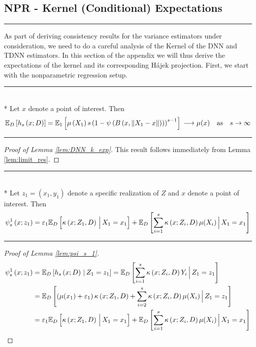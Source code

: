 \newpage
\subsection{NPR - Kernel (Conditional) Expectations}\label{subsec:KernelCondExp}
\hrule
As part of deriving consistency results for the variance estimators under consideration, we need to do a careful analysis of the Kernel of the DNN and TDNN estimators.
In this section of the appendix we will thus derive the expectations of the kernel and its corresponding H\'ajek projection.
First, we start with the nonparametric regression setup.
\vspace{0.5cm}
\hrule

\begin{lem}\label{lem:DNN_k_exp}\mbox{}\\*
	Let $x$ denote a point of interest.
	Then
	\begin{equation}
		\mathbb{E}_D\left[h_s\left(x; D\right)\right]
		= \mathbb{E}_{1}\left[\mu\left(X_1\right) s\left(1 - \psi\left(B\left(x, \|X_1 - x\|\right)\right)\right)^{s-1}\right]\\
		\longrightarrow \mu(x) \quad \text{as} \quad s \rightarrow \infty
	\end{equation}
\end{lem}
\hrule
\begin{proof}[Proof of Lemma \ref{lem:DNN_k_exp}]
	This result follows immediately from Lemma \ref{lem:limit_res}.
\end{proof}

\hrule

\begin{lem}\label{lem:psi_s_1}\mbox{}\\*
	Let $z_1 = (x_1, y_1)$ denote a specific realization of $Z$ and $x$ denote a point of interest.
	Then
	\begin{equation}
		\psi_{s}^{1}\left(x; z_1\right)
		= \varepsilon_1 \mathbb{E}_D\left[\kappa\left(x; Z_1, D\right)\, \Big| \, X_1 = x_1 \right]
		+ \mathbb{E}_{D}\left[\sum_{i = 1}^{s} \kappa\left(x; Z_{i}, D\right) \mu(X_{i})\, \Big| \, X_1 = x_1 \right]
	\end{equation}
\end{lem}
\hrule
\begin{proof}[Proof of Lemma \ref{lem:psi_s_1}]
	\begin{equation}
		\begin{aligned}
			\psi_{s}^{1}\left(x; z_1\right)
			 & = \mathbb{E}_{D}\left[h_{s}\left(x; D\right) \, | \, Z_1 = z_1 \right]
			= \mathbb{E}_{D}\left[\sum_{i = 1}^{s} \kappa\left(x; Z_{i}, D\right) Y_{i} \, \Big| \, Z_1 = z_1 \right]  \\
			 & = \mathbb{E}_{D}\left[\left(\mu(x_1) + \varepsilon_1\right)\kappa\left(x; Z_1, D\right)
			+ \sum_{i = 2}^{s} \kappa\left(x; Z_{i}, D\right) \mu(X_{i})\, \Big| \, Z_1 = z_1 \right] \\
			 & = \varepsilon_1 \mathbb{E}_D\left[\kappa\left(x; Z_1, D\right)\, \Big| \, X_1 = x_1 \right]
			+ \mathbb{E}_{D}\left[\sum_{i = 1}^{s} \kappa\left(x; Z_{i}, D\right) \mu(X_{i})\, \Big| \, X_1 = x_1 \right]
		\end{aligned}
	\end{equation}
\end{proof}
